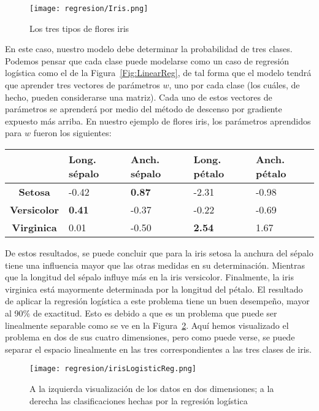 \begin{figure}
 \centering
 \texttt{[image: regresion/Iris.png]}
 \caption{Los tres tipos de flores iris}\label{Fig:iris}
\end{figure} 

En este caso, nuestro modelo debe determinar la probabilidad de tres clases. Podemos pensar que cada clase puede modelarse como un caso de regresión logística como el de la Figura~\ref{Fig:LinearReg}, de tal forma que el modelo tendrá que aprender tres vectores de parámetros $w$, uno por cada clase (los cuáles, de hecho, pueden considerarse una matriz). Cada uno de estos vectores de parámetros se aprenderá por medio del método de descenso por gradiente expuesto más arriba. En nuestro ejemplo de flores iris, los parámetros aprendidos para $w$ fueron los siguientes:

\begin{center}
        \begin{tabular}{ c | l l l l } \hline
          ~ & \textbf{Long. sépalo} & \textbf{Anch. sépalo} & \textbf{Long. pétalo} & \textbf{Anch. pétalo}\\ \hline
          \textbf{Setosa} & -0.42 & \textbf{0.87} & -2.31 & -0.98 \\
	\textbf{Versicolor} & \textbf{0.41} & -0.37 & -0.22 & -0.69 \\
	\textbf{Virginica}  & 0.01 & -0.50 & \textbf{2.54} & 1.67 \\ \hline
        \end{tabular}
    \end{center}

De estos resultados, se puede concluir que para la iris setosa la anchura del sépalo tiene una influencia mayor que las otras medidas en su determinación. Mientras que la longitud del sépalo influye más en la iris versicolor. Finalmente, la iris virginica está mayormente determinada por la longitud del pétalo. El resultado de aplicar la regresión logística a este problema tiene un buen desempeño, mayor al 90\% de exactitud. Esto es debido a que es un problema que puede ser linealmente separable como se ve en la Figura~\ref{Fig:irisLogisticReg}. Aquí hemos visualizado el problema en dos de sus cuatro dimensiones, pero como puede verse, se puede separar el espacio linealmente en las tres correspondientes a las tres clases de iris.

\begin{figure}
 \centering
 \texttt{[image: regresion/irisLogisticReg.png]}
 \caption{A la izquierda visualización de los datos en dos dimensiones; a la derecha las clasificaciones hechas por la regresión logística}\label{Fig:irisLogisticReg}
\end{figure} 




